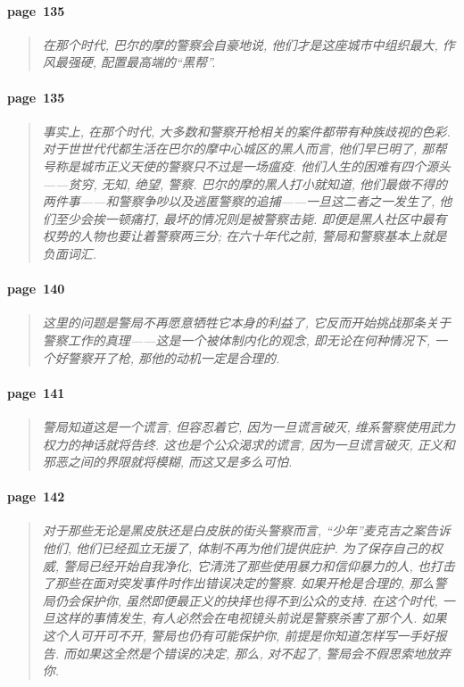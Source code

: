 \paragraph*{page~135}
\begin{quotation}
    \itshape
    在那个时代, 巴尔的摩的警察会自豪地说, 他们才是这座城市中组织最大, 作风最强硬, 配置最高端的``黑帮''.
\end{quotation}

\paragraph*{page~135}
\begin{quotation}
    \itshape
    事实上, 在那个时代, 大多数和警察开枪相关的案件都带有种族歧视的色彩. 对于世世代代都生活在巴尔的摩中心城区的黑人而言, 他们早已明了, 那帮号称是城市正义天使的警察只不过是一场瘟疫. 他们人生的困难有四个源头------贫穷, 无知, 绝望, 警察. 巴尔的摩的黑人打小就知道, 他们最做不得的两件事------和警察争吵以及逃匿警察的追捕------一旦这二者之一发生了, 他们至少会挨一顿痛打, 最坏的情况则是被警察击毙. 即便是黑人社区中最有权势的人物也要让着警察两三分; 在六十年代之前, 警局和警察基本上就是负面词汇. 
\end{quotation}

\paragraph*{page~140}
\begin{quotation}
    \itshape
    这里的问题是警局不再愿意牺牲它本身的利益了, 它反而开始挑战那条关于警察工作的真理------这是一个被体制内化的观念, 即无论在何种情况下, 一个好警察开了枪, 那他的动机一定是合理的. 
\end{quotation}

\paragraph*{page~141}
\begin{quotation}
    \itshape
    警局知道这是一个谎言, 但容忍着它, 因为一旦谎言破灭, 维系警察使用武力权力的神话就将告终. 这也是个公众渴求的谎言, 因为一旦谎言破灭, 正义和邪恶之间的界限就将模糊, 而这又是多么可怕. 
\end{quotation}

\paragraph*{page~142}
\begin{quotation}
    \itshape
    对于那些无论是黑皮肤还是白皮肤的街头警察而言, ``少年''麦克吉之案告诉他们, 他们已经孤立无援了, 体制不再为他们提供庇护. 为了保存自己的权威, 警局已经开始自我净化, 它清洗了那些使用暴力和信仰暴力的人, 也打击了那些在面对突发事件时作出错误决定的警察. 如果开枪是合理的, 那么警局仍会保护你, 虽然即便最正义的抉择也得不到公众的支持. 在这个时代, 一旦这样的事情发生, 有人必然会在电视镜头前说是警察杀害了那个人. 如果这个人可开可不开, 警局也仍有可能保护你, 前提是你知道怎样写一手好报告. 而如果这全然是个错误的决定, 那么, 对不起了, 警局会不假思索地放弃你. 
\end{quotation}

